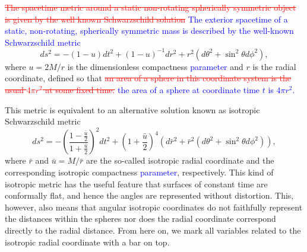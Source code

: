 \documentclass{aa}
\newcommand{\be}{\begin{equation}}
\newcommand{\ee}{\end{equation}}
\newcommand{\refe}[1]{\textcolor{blue}{{#1}}}
\newcommand{\refedel}[1]{\textcolor{red}{\sout{#1}}}
\newcommand{\sch}{Schwarzschild }
\newcommand{\rb}{\ensuremath{\bar{r}}}
\newcommand{\ub}{\ensuremath{\bar{u}}}
\begin{document}
\refedel{The spacetime metric around a static non-rotating spherically symmetric object is given by the well known \sch solution}
\refe{ The exterior spacetime of a static, non-rotating, spherically symmetric mass is described by the well-known Schwarzschild metric}
\be
ds^2  = -(1-u) dt^2 + (1-u)^{-1}dr^2+r^2(d\theta^2+\sin^2\theta d\phi^2),
\ee
where $u = 2M/r$ is the dimensionless compactness \refe{parameter} and $r$ is the radial coordinate, defined so that 
\refedel{an area of a sphere in this coordinate system is the usual $4\pi r^2$ at some fixed time.}
\refe{the area of a sphere at coordinate time $t$ is $4\pi r^2$.}

This metric is equivalent to an alternative solution known as isotropic \sch metric \citep[see e.g.][]{MTW73}
\be
\label{eq:ISch}
ds^2 = -\left( \frac{1-\frac{\ub}{2}}{1+\frac{\ub}{2}} \right)^2 dt^2 + (1+\frac{\ub}{2})^4(d\rb^2 + \rb^2(d\theta^2+\sin^2\theta d\phi^2)),
\ee
where  $\rb$ and $\ub=M/\rb$ are the so-called isotropic radial
coordinate and the corresponding isotropic compactness \refe{parameter},
respectively. 
This kind of isotropic metric has the useful feature that surfaces of constant time are conformally flat, and hence the angles are represented without distortion.
This, however, also means that angular isotropic coordinates do not faithfully represent the distances within the spheres nor does the radial coordinate correspond directly to the radial distance.
From here on, we mark all variables related to the isotropic radial coordinate with a bar on top.
\end{document}
